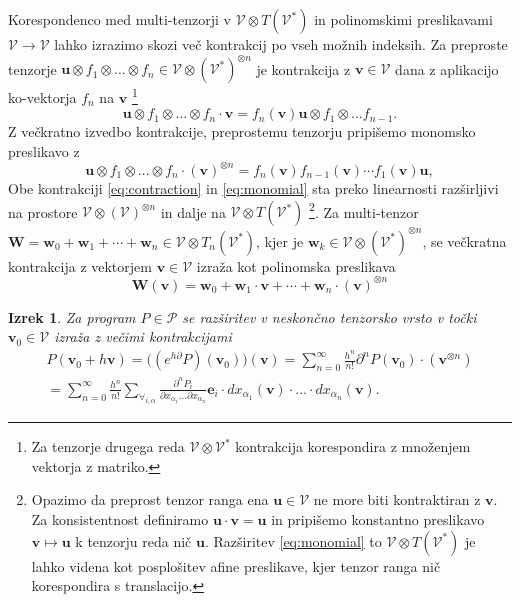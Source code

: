 \documentclass[a4paper, 12pt]{book}
\newcommand{\bfW}{\mathbf{W}}
\newcommand{\bfw}{\mathbf{w}}
\newcommand{\VV}{\mathcal{V}}
\newcommand{\e}{\mathbf{e}}
\newcommand{\uu}{\mathbf{u}}
\newcommand{\vv}{\mathbf{v}}
\newcommand{\dP}{\mathcal{P}}
\newcommand{\D}{\partial}
\newtheorem{izrek}{Izrek}[chapter]
\begin{document}
Korespondenco med multi-tenzorji v $\VV\otimes T(\VV^ *)$ in polinomskimi preslikavami $\VV\to\VV$ lahko izrazimo skozi več kontrakcij po vseh možnih indeksih. Za preproste tenzorje  $\uu\otimes
 f_1\otimes\ldots\otimes f_n\in \VV\otimes(\VV^*)^{\otimes n}$ je kontrakcija z $\vv\in\VV$ dana z aplikacijo ko-vektorja $f_n$ na $\vv$ \footnote{Za tenzorje drugega reda $\VV\otimes\VV^*$ kontrakcija korespondira z množenjem vektorja z matriko.}
\begin{equation}
   \label{eq:contraction}
 \uu\otimes f_1\otimes\ldots\otimes f_n\cdot \vv = f_n(\vv) \uu\otimes f_1\otimes\ldots f_{n-1}.
\end{equation}
Z večkratno izvedbo kontrakcije, preprostemu tenzorju pripišemo monomsko preslikavo z
 \begin{equation}
   \label{eq:monomial}
 \uu\otimes f_1\otimes\ldots\otimes f_n\cdot (\vv)^{\otimes n} = f_n(\vv)f_{n-1}(\vv)\cdots f_1(\vv) \uu,
\end{equation}
Obe kontrakciji \eqref{eq:contraction} in \eqref{eq:monomial} sta preko linearnosti razširljivi na prostore $\VV\otimes(\VV)^{\otimes n}$ in dalje na $\VV\otimes T(\VV^ *)$ \footnote{Opazimo da preprost tenzor ranga ena
  $\uu\in\VV$ ne more biti kontraktiran z $\vv$. Za konsistentnost definiramo $\uu\cdot \vv = \uu$ in pripišemo konstantno preslikavo
  $\vv\mapsto \uu$ k tenzorju reda nič $\uu$. Razširitev
  \eqref{eq:monomial}
  to $\VV\otimes T(\VV^*)$ je lahko videna kot posplošitev afine preslikave,
  kjer tenzor ranga nič korespondira s translacijo.}. Za multi-tenzor $\bfW=\bfw_0+\bfw_1+\cdots+\bfw_n\in\VV\otimes T_n(\VV^*)$, kjer je $\bfw_k\in\VV\otimes(\VV^*)^{\otimes n}$, se večkratna kontrakcija z vektorjem $\vv\in\VV$ izraža kot polinomska preslikava
  \begin{equation}
  \label{eq:polynomial_tensor}
  \bfW(\vv)=\bfw_0+\bfw_1\cdot\vv+\cdots+\bfw_n\cdot(\vv)^{\otimes n}
  \end{equation}

\begin{izrek}\label{izr:e^d}
	Za program $P\in\dP$  se razširitev v neskončno tenzorsko vrsto
  v točki $\vv_0\in \VV$ izraža z večimi kontrakcijami 
	\begin{multline}\label{eq:tenzorVrsta}
	P(\vv_0+h\vv) = \Big((e^{h\D}P)(\vv_0)\Big)(\vv)
  = \sum_{n=0}^\infty\frac{h^n}{n!}\D^nP(\vv_0)\cdot (\vv^{\otimes n})\\
  = \sum_{n=0}^\infty \frac{h^n}{n!}\sum_{\forall_{i,\alpha}}\frac{\partial^nP_i}{\partial
 		    x_{\alpha_1}\ldots \partial x_{\alpha_n}}\e_i\cdot
 		  dx_{\alpha_1}(\vv)\cdot\ldots \cdot dx_{\alpha_n}(\vv).
	\end{multline}
\end{izrek}
 
\end{document}
